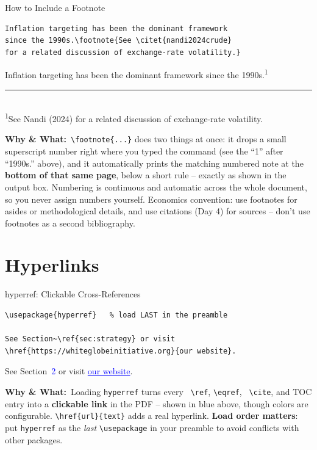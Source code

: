 \documentclass[11pt,aspectratio=169]{beamer}
\newcommand{\whybox}[1]{%
  \vspace{2pt}
  {\scriptsize\raggedright\textcolor{red!55!black}{\textbf{Why \& What:}}~#1\par}
}
\begin{document}
\begin{frame}[fragile]{How to Include a Footnote}
  \begin{lstlisting}
Inflation targeting has been the dominant framework
since the 1990s.\footnote{See \citet{nandi2024crude}
for a related discussion of exchange-rate volatility.}
  \end{lstlisting}
  \begin{outputbox}
    \small Inflation targeting has been the dominant framework since
    the 1990s.\textsuperscript{1}\\[14pt]
    \rule{3.2cm}{0.3pt}\\
    {\tiny \textsuperscript{1}See Nandi (2024) for a related discussion of exchange-rate volatility.}
  \end{outputbox}
  \whybox{\texttt{\textbackslash footnote\{...\}} does two things at
  once: it drops a small superscript number right where you typed the
  command (see the ``1'' after ``1990s.'' above), and it automatically
  prints the matching numbered note at the \textbf{bottom of that same
  page}, below a short rule -- exactly as shown in the output box.
  Numbering is continuous and automatic across the whole document, so
  you never assign numbers yourself. Economics convention: use
  footnotes for asides or methodological details, and use citations
  (Day 4) for sources -- don't use footnotes as a second bibliography.}
\end{frame}

\section{Hyperlinks}

\begin{frame}[fragile]{hyperref: Clickable Cross-References}
  \begin{lstlisting}
\usepackage{hyperref}   % load LAST in the preamble

See Section~\ref{sec:strategy} or visit
\href{https://whiteglobeinitiative.org}{our website}.
  \end{lstlisting}
  \begin{outputbox}
    \small See Section~\textcolor{blue}{2} or visit
    \textcolor{blue}{\underline{our website}}.
  \end{outputbox}
  \whybox{Loading \texttt{hyperref} turns every \texttt{
  \textbackslash ref}, \texttt{\textbackslash eqref}, \texttt{
  \textbackslash cite}, and TOC entry into a \textbf{clickable link}
  in the PDF -- shown in blue above, though colors are configurable.
  \texttt{\textbackslash href\{url\}\{text\}} adds a real hyperlink.
  \textbf{Load order matters}: put \texttt{hyperref} as the
  \emph{last} \texttt{\textbackslash usepackage} in your preamble to
  avoid conflicts with other packages.}
\end{frame}
\end{document}
